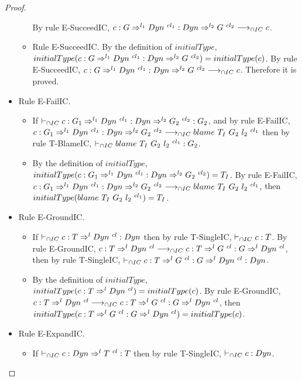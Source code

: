 \documentclass[a4paper]{article}
\begin{document}
\begin{proof}
\begin{itemize}
\begin{itemize}
        By rule E-SucceedIC, $c : G \Rightarrow^{l_1} Dyn\ ^{cl_1} : Dyn \Rightarrow^{l_2} G\ ^{cl_2} \longrightarrow_{\cap IC} c$.
        \item Rule E-SucceedIC.
        By the definition of $initialType$, $initialType(c : G \Rightarrow^{l_1} \Dyn\ ^{cl_1} : \Dyn \Rightarrow^{l_2} G\ ^{cl_2}) = initialType(c)$.
        By rule E-SucceedIC, $c : G \Rightarrow^{l_1} Dyn\ ^{cl_1} : Dyn \Rightarrow^{l_2} G\ ^{cl_2} \longrightarrow_{\cap IC} c$.
        Therefore it is proved.
    \end{itemize}
    \item Rule E-FailIC.
    \begin{itemize}
        \item If $\vdash_{\cap IC} c : G_1 \Rightarrow^{l_1} Dyn\ ^{cl_1} : Dyn \Rightarrow^{l_2} G_2\ ^{cl_2} : G_2$, and by rule E-FailIC, $c : G_1 \Rightarrow^{l_1} \Dyn\ ^{cl_1} : \Dyn \Rightarrow^{l_2} G_2\ ^{cl_2} \icos \blamecast{T_I}{G_2}{l_2}{cl_1}$ then by rule T-BlameIC, $\vdash_{\cap IC} blame\ T_I\ G_2\ l_2\ ^{cl_1} : G_2$.
        \item By the definition of $initialType$, $initialType(c : G_1 \Rightarrow^{l_1} \Dyn\ ^{cl_1} : \Dyn \Rightarrow^{l_2} G_2\ ^{cl_2}) = T_I$.
        By rule E-FailIC, $c : G_1 \Rightarrow^{l_1} \Dyn\ ^{cl_1} : \Dyn \Rightarrow^{l_2} G_2\ ^{cl_2} \icos \blamecast{T_I}{G_2}{l_2}{cl_1}$, then $initialType(blame\ T_I\ G_2\ l_2\ ^{cl_1}) = T_I$.
    \end{itemize}
    \item Rule E-GroundIC.
    \begin{itemize}
        \item If $\icts c : T \Rightarrow^l \Dyn\ ^{cl} : \Dyn$ then by rule T-SingleIC, $\vdash_{\cap IC} c : T$.
        By rule E-GroundIC, $c : T \Rightarrow^l Dyn\ ^{cl} \longrightarrow_{\cap IC} c : T \Rightarrow^l G\ ^{cl} : G \Rightarrow^l Dyn\ ^{cl}$, then by rule T-SingleIC, $\icts c : T \Rightarrow^l G\ ^{cl} : G \Rightarrow^l \Dyn\ ^{cl} : \Dyn$.
        \item By the definition of $initialType$, $initialType(c : T \Rightarrow^l Dyn\ ^{cl}) = initialType(c)$.
        By rule E-GroundIC, $c : T \Rightarrow^l Dyn\ ^{cl} \longrightarrow_{\cap IC} c : T \Rightarrow^l G\ ^{cl} : G \Rightarrow^l Dyn\ ^{cl}$, then $initialType(c : T \Rightarrow^l G\ ^{cl} : G \Rightarrow^l Dyn\ ^{cl}) = initialType(c)$.
    \end{itemize}
    \item Rule E-ExpandIC.
    \begin{itemize}
        \item If $\icts c : \Dyn \Rightarrow^l T\ ^{cl} : T$ then by rule T-SingleIC, $\vdash_{\cap IC} c : Dyn$.

\end{itemize}
\end{itemize}
\end{proof}
\end{document}
